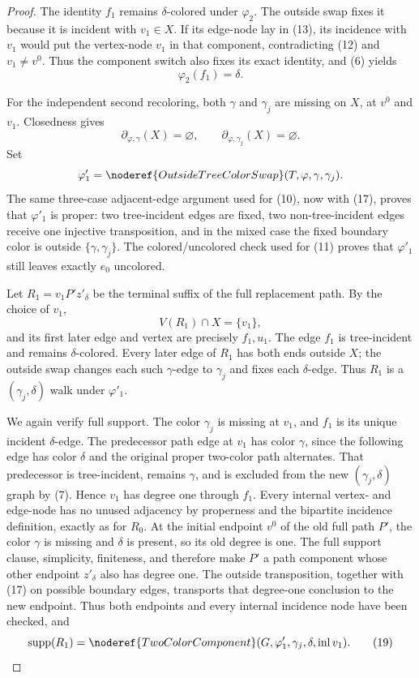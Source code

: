 \begin{proof}
The identity $f_1$ remains $\delta$-colored under $\varphi_2$.  The
outside swap fixes it because it is incident with $v_1\in X$.  If its
edge-node lay in (13), its incidence with $v_1$ would put the vertex-node
$v_1$ in that component, contradicting (12) and $v_1\ne v^0$.  Thus the
component switch also fixes its exact identity, and (6) yields
\[
 \varphi_2(f_1)=\delta.                                      \tag{16}
\]

For the independent second recoloring, both $\gamma$ and $\gamma_j$ are
missing on $X$, at $v^0$ and $v_1$.  Closedness gives
\[
 \partial_{\varphi,\gamma}(X)=\varnothing,
 \qquad \partial_{\varphi,\gamma_j}(X)=\varnothing.          \tag{17}
\]
Set
\[
 \varphi'_1=\noderef{OutsideTreeColorSwap}
   (T,\varphi,\gamma,\gamma_j).
\]
The same three-case adjacent-edge argument used for (10), now with (17),
proves that $\varphi'_1$ is proper: two tree-incident edges are fixed, two
non-tree-incident edges receive one injective transposition, and in the
mixed case the fixed boundary color is outside
$\{\gamma,\gamma_j\}$.  The colored/uncolored check used for (11) proves
that $\varphi'_1$ still leaves exactly $e_0$ uncolored.

Let $R_1=v_1P'z'_\delta$ be the terminal suffix of the full replacement
path.  By the choice of $v_1$,
\[
 V(R_1)\cap X=\{v_1\},                                      \tag{18}
\]
and its first later edge and vertex are precisely $f_1,u_1$.  The edge
$f_1$ is tree-incident and remains $\delta$-colored.  Every later edge of
$R_1$ has both ends outside $X$; the outside swap changes each such
$\gamma$-edge to $\gamma_j$ and fixes each $\delta$-edge.  Thus $R_1$ is
a $(\gamma_j,\delta)$ walk under $\varphi'_1$.

We again verify full support.  The color $\gamma_j$ is missing at $v_1$,
and $f_1$ is its unique incident $\delta$-edge.  The predecessor path
edge at $v_1$ has color $\gamma$, since the following edge has color
$\delta$ and the original proper two-color path alternates.  That
predecessor is tree-incident, remains $\gamma$, and is excluded from the
new $(\gamma_j,\delta)$ graph by (7).  Hence $v_1$ has degree one through
$f_1$.  Every internal vertex- and edge-node has no unused adjacency by
properness and the bipartite incidence definition, exactly as for
$R_0$.  At the initial endpoint $v^0$ of the old full path $P'$, the color
$\gamma$ is missing and $\delta$ is present, so its old degree is one.
The full support clause, simplicity, finiteness, and
 therefore make $P'$ a path
component whose other endpoint $z'_\delta$ also has degree one.  The
outside transposition, together with (17) on possible boundary edges,
transports that degree-one conclusion to the new endpoint.  Thus both
endpoints and every internal incidence node have been checked, and
\[
 \operatorname{supp}(R_1)=
 \noderef{TwoColorComponent}
   (G,\varphi'_1,\gamma_j,\delta,\operatorname{inl}v_1).      \tag{19}
\]


\end{proof}
